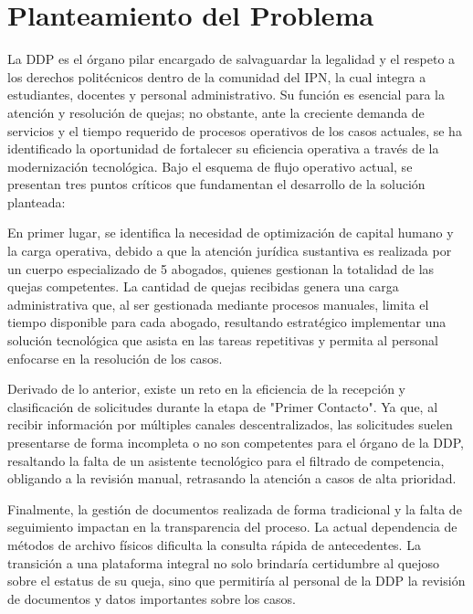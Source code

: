     \section{Planteamiento del Problema}

        La DDP es el órgano pilar encargado de salvaguardar la legalidad y el respeto a los derechos politécnicos dentro de la comunidad del IPN, la cual integra a estudiantes, docentes y personal administrativo. Su función es esencial para la atención y resolución de quejas; no obstante, ante la creciente demanda de servicios y el tiempo requerido de procesos operativos de los casos actuales, se ha identificado la oportunidad de fortalecer su eficiencia operativa a través de la modernización tecnológica. Bajo el esquema de flujo operativo actual, se presentan tres puntos críticos que fundamentan el desarrollo de la solución planteada:
        
        En primer lugar, se identifica la necesidad de optimización de capital humano y la carga operativa, debido a que la atención jurídica sustantiva es realizada por un cuerpo especializado de 5 abogados, quienes gestionan la totalidad de las quejas competentes. La cantidad de quejas recibidas genera una carga administrativa que, al ser gestionada mediante procesos manuales, limita el tiempo disponible para cada abogado, resultando estratégico implementar una solución tecnológica que asista en las tareas repetitivas y permita al personal enfocarse en la resolución de los casos.
        
        Derivado de lo anterior, existe un reto en la eficiencia de la recepción y clasificación de solicitudes durante la etapa de "Primer Contacto". Ya que, al recibir información por múltiples canales descentralizados, las solicitudes suelen presentarse de forma incompleta o no son competentes para el órgano de la DDP, resaltando la falta de un asistente tecnológico para el filtrado de competencia, obligando a la revisión manual, retrasando la atención a casos de alta prioridad.
        
        Finalmente, la gestión de documentos realizada de forma tradicional y la falta de seguimiento impactan en la transparencia del proceso. La actual dependencia de métodos de archivo físicos dificulta la consulta rápida de antecedentes. La transición a una plataforma integral no solo brindaría certidumbre al quejoso sobre el estatus de su queja, sino que permitiría al personal de la DDP la revisión de documentos y datos importantes sobre los casos.

